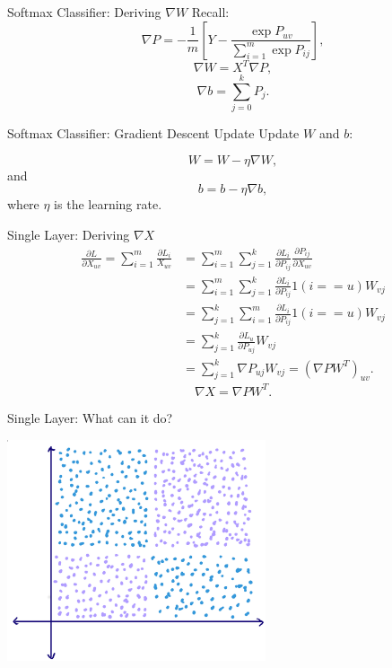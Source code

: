 \documentclass{beamer}
\begin{document}
  \begin{frame}{Softmax Classifier: Deriving $\nabla W$}
    Recall:
    $$ \nabla P = -\frac{1}{m} \left[ Y -
    \frac{\exp{P_{uv}}}{\sum_{i=1}^m\exp{P_{ij}}} \right], $$
    $$ \nabla W = X^T \nabla P, $$
    $$ \nabla b = \sum_{j=0}^k P_j. $$
  \end{frame}

  \begin{frame}{Softmax Classifier: Gradient Descent Update}
    Update $W$ and $b$:
    \begin{center}
      $$ W = W - \eta \nabla W, $$
      and
      $$ b = b - \eta \nabla b, $$
      where $\eta$ is the learning rate.
    \end{center}
  \end{frame}

  \begin{frame}{Single Layer: Deriving $\nabla X$}
    \begin{align*}
      \frac{\partial L}{\partial X_{uv}} 
      =\sum_{i=1}^m \frac{\partial L_i}{X_{uv}}
      &= \sum_{i=1}^m \sum_{j=1}^k \frac{\partial L_i}{\partial P_{ij}}
          \frac{\partial P_{ij}}{\partial X_{uv}}\\
      &= \sum_{i=1}^m \sum_{j=1}^k \frac{\partial L_i}{\partial P_{ij}}
          1(i == u) W_{vj}\\
      &= \sum_{j=1}^k \sum_{i=1}^m \frac{\partial L_i}{\partial P_{ij}}
          1(i == u) W_{vj}\\
      &= \sum_{j=1}^k \frac{\partial L_u}{\partial P_{uj}} W_{vj}\\
      &= \sum_{j=1}^k \nabla P_{uj} W_{vj}
       = \left( \nabla P W^T \right) _{uv}.
    \end{align*}
    $$ \nabla X = \nabla P W^T. $$
  \end{frame}

  \begin{frame}{Single Layer: What can it do?}
    \begin{center}
      \includegraphics[width=3in]{../figures/onelayer.eps}
    \end{center}
  \end{frame}
\end{document}
